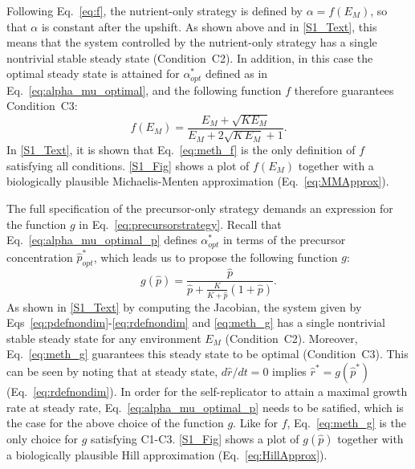 Following Eq.~\ref{eq:f}, the nutrient-only strategy is defined by $\alpha = f(E_M)$, so that $\alpha$ is constant after the upshift.
As shown above and in \ref{S1_Text}, this means that the system controlled by the nutrient-only strategy has a single nontrivial stable steady state (Condition~C2). 
In addition, in this case the optimal steady state is attained for $\alpha^*_{opt}$ defined as in Eq.~\ref{eq:alpha_mu_optimal}, and the following function $f$ therefore guarantees Condition~C3:
\begin{equation}
\label{eq:meth_f}
f(E_M) = \frac{E_M + \sqrt{K E_M}}{E_M + 2\sqrt{K\, E_M} + 1}.
\end{equation}
In \ref{S1_Text}, it is shown that Eq.~\ref{eq:meth_f} is the only definition of $f$ satisfying all conditions.
\ref{S1_Fig} shows a plot of $f(E_M)$ together with a biologically plausible Michaelis-Menten approximation (Eq.~\ref{eq:MMApprox}).

The full specification of the precursor-only strategy demands an expression for the function $g$ in Eq.~\ref{eq:precursorstrategy}.
Recall that Eq.~\ref{eq:alpha_mu_optimal_p} defines $\alpha_{opt}^*$ in terms of the precursor concentration $\hat{p}_{opt}^*$, which leads us to propose the following function $g$:
\begin{equation}
\label{eq:meth_g}
g(\hat{p}) = \frac{\hat{p}}{\hat{p} + \frac{K}{K + \hat{p}}(1+\hat{p})}.
\end{equation}
As shown in \ref{S1_Text} by computing the Jacobian, the system given by \linebreak Eqs~\ref{eq:pdefnondim}-\ref{eq:rdefnondim} and \ref{eq:meth_g} has a single nontrivial stable steady state for any environment $E_M$ (Condition~C2).
Moreover, Eq.~\ref{eq:meth_g} guarantees this steady state to be optimal (Condition~C3).
This can be seen by noting that at steady state, $d\hat{r}/dt=0$ implies $\hat{r}^*=g(\hat{p}^*)$ (Eq.~\ref{eq:rdefnondim}).
In order for the self-replicator to attain a maximal growth rate at steady rate, Eq.~\ref{eq:alpha_mu_optimal_p} needs to be satified, which is the case for the above choice of the function $g$.
Like for $f$, Eq.~\ref{eq:meth_g} is the only choice for $g$ satisfying C1-C3.
\ref{S1_Fig} shows a plot of $g(\hat{p})$ together with a biologically plausible Hill approximation (Eq.~\ref{eq:HillApprox}).

